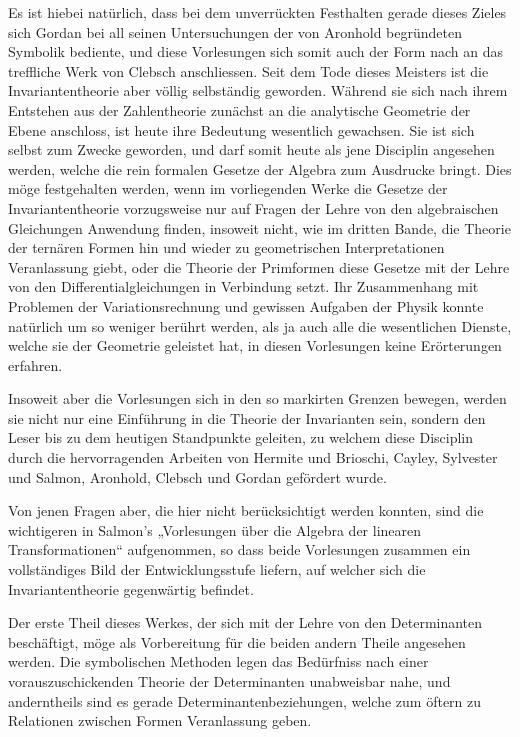 \documentclass[10pt]{article}
\begin{document}
Es ist hiebei natürlich, dass bei dem unverrückten Festhalten gerade dieses Zieles sich Gordan bei all seinen Untersuchungen der von Aronhold begründeten Symbolik bediente, und diese Vorlesungen sich somit auch der Form nach an das treffliche Werk von Clebsch anschliessen. Seit dem Tode dieses Meisters ist die Invariantentheorie aber völlig selbständig geworden. Während sie sich nach ihrem Entstehen aus der Zahlentheorie zunächst an die analytische Geometrie der Ebene anschloss, ist heute ihre Bedeutung wesentlich gewachsen. Sie ist sich selbst zum Zwecke geworden, und darf somit heute als jene Disciplin angesehen werden, welche die rein formalen Gesetze der Algebra zum Ausdrucke bringt. Dies möge festgehalten werden, wenn im vorliegenden Werke die Gesetze der Invariantentheorie vorzugsweise nur auf Fragen der Lehre von den algebraischen Gleichungen Anwendung finden, insoweit nicht, wie im dritten Bande, die Theorie der ternären Formen hin und wieder zu geometrischen Interpretationen Veranlassung giebt, oder die Theorie der Primformen diese Gesetze mit der Lehre von den Differentialgleichungen in Verbindung setzt. Ihr Zusammenhang mit Problemen der Variationsrechnung und gewissen Aufgaben der Physik konnte natürlich um so weniger berührt werden, als ja auch alle die wesentlichen Dienste, welche sie der Geometrie geleistet hat, in diesen Vorlesungen keine Erörterungen erfahren.

Insoweit aber die Vorlesungen sich in den so markirten Grenzen bewegen, werden sie nicht nur eine Einführung in die Theorie der Invarianten sein, sondern den Leser bis zu dem heutigen Standpunkte geleiten, zu welchem diese Disciplin durch die hervorragenden Arbeiten von Hermite und Brioschi, Cayley, Sylvester und Salmon, Aronhold, Clebsch und Gordan gefördert wurde.

Von jenen Fragen aber, die hier nicht berücksichtigt werden konnten, sind die wichtigeren in Salmon's „Vorlesungen über die Algebra der linearen Transformationen“ aufgenommen, so dass beide Vorlesungen zusammen ein vollständiges Bild der Entwicklungsstufe liefern, auf welcher sich die Invariantentheorie gegenwärtig befindet.

Der erste Theil dieses Werkes, der sich mit der Lehre von den Determinanten beschäftigt, möge als Vorbereitung für die beiden andern Theile angesehen werden. Die symbolischen Methoden legen das Bedürfniss nach einer vorauszuschickenden Theorie der Determinanten unabweisbar nahe, und anderntheils sind es gerade Determinantenbeziehungen, welche zum öftern zu Relationen zwischen Formen Veranlassung geben.
\end{document}
